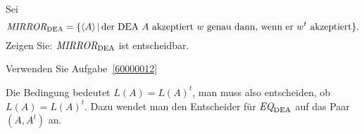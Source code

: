 Sei
\[
\text{\it MIRROR}_{\text{DEA}}
= \{\langle A\rangle\,|\,
\text{der DEA $A$ akzeptiert $w$ genau dann, wenn er $w^t$ akzeptiert}\}.
\]
Zeigen Sie: $\text{\it MIRROR}_\text{DEA}$ ist entscheidbar.

\begin{hinweis}
Verwenden Sie Aufgabe~\ref{60000012}
\end{hinweis}

\begin{loesung}
Die Bedingung bedeutet $L(A)=L(A)^t$, man muss also entscheiden,
ob $L(A)=L(A)^t$. Dazu wendet man den Entscheider für
$\text{\it EQ}_{\text{DEA}}$ auf das Paar $(A,A^t)$ an.
\end{loesung}
